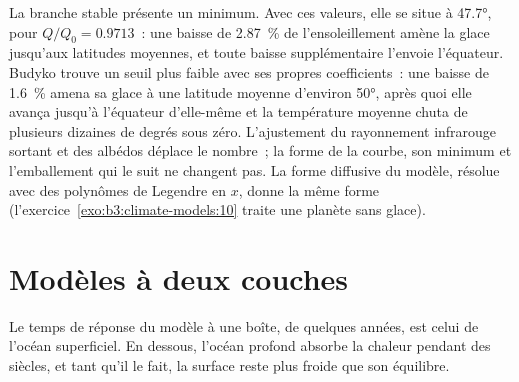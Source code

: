 \begin{omfigure}
\par{}\label{fig:b3:climate-models:budyko}
\end{omfigure}

La branche stable présente un minimum. Avec ces valeurs, elle se situe à \ang{47.7},
pour $Q/Q_0 = \num{0.9713}$~: une baisse de \qty{2.87}{\percent} de l'ensoleillement
amène la glace jusqu'aux latitudes moyennes, et toute baisse supplémentaire l'envoie
l'équateur. Budyko trouve un seuil plus faible avec ses propres coefficients~: une
baisse de \qty{1.6}{\percent} amena sa glace à une latitude moyenne d'environ
\ang{50}, après quoi elle avança jusqu'à l'équateur d'elle-même et la température
moyenne chuta de plusieurs dizaines de degrés sous zéro. L'ajustement du rayonnement infrarouge
sortant et des albédos déplace le nombre~; la forme de la courbe, son minimum et l'emballement
qui le suit ne changent pas. La forme diffusive du modèle, résolue avec
des polynômes de Legendre en $x$, donne la même forme (l'exercice~\ref{exo:b3:climate-models:10}
traite une planète sans glace).

\section{Modèles à deux couches}\label{sec:b3:climate-models:two-layer}

Le temps de réponse du modèle à une boîte, de quelques années, est celui de
l'océan superficiel. En dessous, l'océan profond absorbe la chaleur pendant des siècles, et tant
qu'il le fait, la surface reste plus froide que son équilibre.

